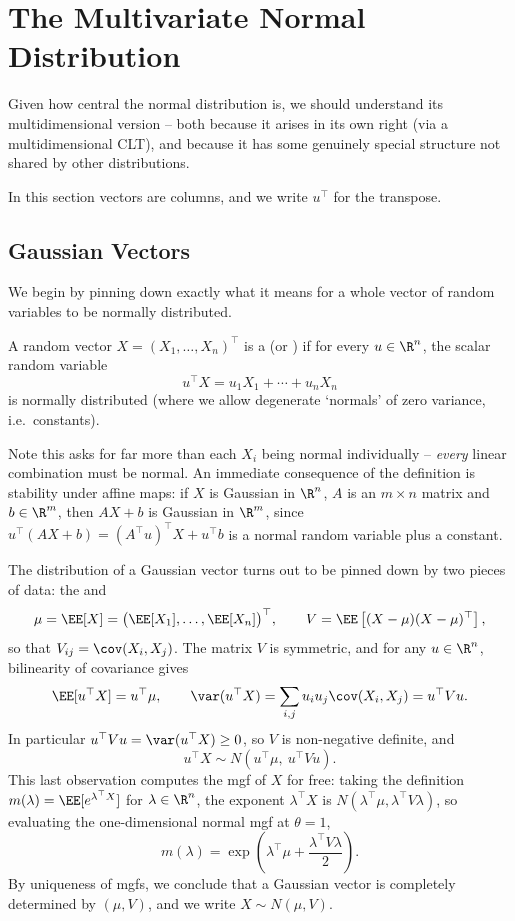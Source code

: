 \section{The Multivariate Normal Distribution}

Given how central the normal distribution is, we should understand its multidimensional version -- both because it arises in its own right (via a multidimensional CLT), and because it has some genuinely special structure not shared by other distributions.

In this section vectors are columns, and we write $u^\top$ for the transpose.

\subsection{Gaussian Vectors}

We begin by pinning down exactly what it means for a whole vector of random variables to be normally distributed.

\begin{definition}
	A random vector $X = (X_1, \dots, X_n)^\top$ is a  (or ) if for every $u \in \R^n$, the scalar random variable
	$$
	u^\top X = u_1 X_1 + \cdots + u_n X_n
	$$
	is normally distributed (where we allow degenerate `normals' of zero variance, i.e.\ constants).
\end{definition}

Note this asks for far more than each $X_i$ being normal individually -- \emph{every} linear combination must be normal. An immediate consequence of the definition is stability under affine maps: if $X$ is Gaussian in $\R^n$, $A$ is an $m \times n$ matrix and $b \in \R^m$, then $AX + b$ is Gaussian in $\R^m$, since $u^\top(AX + b) = (A^\top u)^\top X + u^\top b$ is a normal random variable plus a constant.

The distribution of a Gaussian vector turns out to be pinned down by two pieces of data: the  and 
$$
\mu = \EE[X] = \big(\EE[X_1], \dots, \EE[X_n]\big)^\top, \qquad V = \EE\left[(X - \mu)(X - \mu)^\top\right],
$$
so that $V_{ij} = \cov(X_i, X_j)$. The matrix $V$ is symmetric, and for any $u \in \R^n$, bilinearity of covariance gives
$$
\EE[u^\top X] = u^\top \mu, \qquad \var(u^\top X) = \sum_{i, j} u_i u_j \cov(X_i, X_j) = u^\top V u.
$$
In particular $u^\top V u = \var(u^\top X) \geq 0$, so $V$ is non-negative definite, and
$$
u^\top X \sim N(u^\top \mu,\ u^\top V u).
$$
This last observation computes the mgf of $X$ for free: taking the definition $m(\lambda) = \EE[e^{\lambda^\top X}]$ for $\lambda \in \R^n$, the exponent $\lambda^\top X$ is $N(\lambda^\top\mu, \lambda^\top V \lambda)$, so evaluating the one-dimensional normal mgf at $\theta = 1$,
$$
m(\lambda) = \exp\left(\lambda^\top \mu + \frac{\lambda^\top V \lambda}{2}\right).
$$
By uniqueness of mgfs, we conclude that a Gaussian vector is completely determined by $(\mu, V)$, and we write $X \sim N(\mu, V)$.

